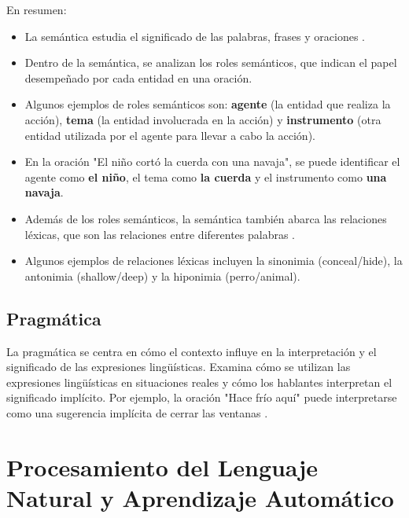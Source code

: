 En resumen:
\begin{itemize}
\item La semántica estudia el significado de las palabras, frases y oraciones \cite{JohnsonMLSS}.
\item Dentro de la semántica, se analizan los roles semánticos, que indican el papel desempeñado por cada entidad en una oración.
\item Algunos ejemplos de roles semánticos son: \textcolor[rgb]{0.00,0.00,1.00}{\textbf{agente}} (la entidad que realiza la acción), \textcolor[rgb]{1.00,0.00,0.00}{\textbf{tema}} (la entidad involucrada en la acción) y \textcolor[rgb]{0.00,1.00,0.00}{\textbf{instrumento}} (otra entidad utilizada por el agente para llevar a cabo la acción).
\item En la oración "El niño cortó la cuerda con una navaja", se puede identificar el agente como \textcolor[rgb]{0.00,0.00,1.00}{\textbf{el niño}}, el tema como \textcolor[rgb]{1.00,0.00,0.00}{\textbf{la cuerda}} y el instrumento como \textcolor[rgb]{0.00,1.00,0.00}{\textbf{una navaja}}.
\item Además de los roles semánticos, la semántica también abarca las relaciones léxicas, que son las relaciones entre diferentes palabras \cite{yule2016study}.
\item Algunos ejemplos de relaciones léxicas incluyen la sinonimia (conceal/hide), la antonimia (shallow/deep) y la hiponimia (perro/animal).
\end{itemize}


\subsection{Pragmática}

La pragmática se centra en cómo el contexto influye en la interpretación y el significado de las expresiones lingüísticas. Examina cómo se utilizan las expresiones lingüísticas en situaciones reales y cómo los hablantes interpretan el significado implícito. Por ejemplo, la oración "Hace frío aquí" puede interpretarse como una sugerencia implícita de cerrar las ventanas \cite{fromkin2018introduction}.


\section{Procesamiento del Lenguaje Natural y Aprendizaje Automático}

